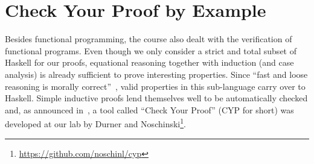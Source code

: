 \section{Check Your Proof by Example}\label{sec:cyp}
Besides functional programming,
the course also dealt with the verification of functional programs.
Even though we only consider a strict and total subset
of Haskell for our proofs,
equational reasoning together with induction
(and case analysis)
is already sufficient to prove interesting properties.
Since ``fast and loose reasoning is morally correct''~\cite{fast_and_loose},
valid properties in this sub-language carry over to Haskell.
Simple inductive proofs lend themselves well to be automatically checked and, as announced in~\cite{next_1100}, a tool called ``Check Your Proof'' (CYP for short) was developed at our lab by Durner and Noschinski\footnote{\url{https://github.com/noschinl/cyp}}.

